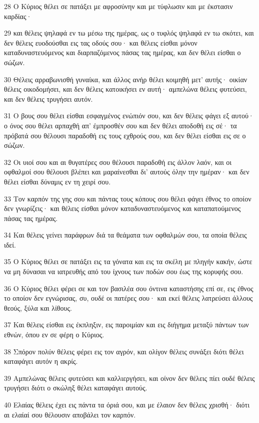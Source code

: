\par 28 Ο Κύριος θέλει σε πατάξει με αφροσύνην και με τύφλωσιν και με έκστασιν καρδίας·
\par 29 και θέλεις ψηλαφά εν τω μέσω της ημέρας, ως ο τυφλός ψηλαφά εν τω σκότει, και δεν θέλεις ευοδούσθαι εις τας οδούς σου· και θέλεις είσθαι μόνον καταδυναστευόμενος και διαρπαζόμενος πάσας τας ημέρας, και δεν θέλει είσθαι ο σώζων.
\par 30 Θέλεις αρραβωνισθή γυναίκα, και άλλος ανήρ θέλει κοιμηθή μετ' αυτής· οικίαν θέλεις οικοδομήσει, και δεν θέλεις κατοικήσει εν αυτή· αμπελώνα θέλεις φυτεύσει, και δεν θέλεις τρυγήσει αυτόν.
\par 31 Ο βους σου θέλει είσθαι εσφαγμένος ενώπιόν σου, και δεν θέλεις φάγει εξ αυτού· ο όνος σου θέλει αρπαχθή απ' έμπροσθέν σου και δεν θέλει αποδοθή εις σέ· τα πρόβατά σου θέλουσι παραδοθή εις τους εχθρούς σου, και δεν θέλει είσθαι εις σε ο σώζων.
\par 32 Οι υιοί σου και αι θυγατέρες σου θέλουσι παραδοθή εις άλλον λαόν, και οι οφθαλμοί σου θέλουσι βλέπει και μαραίνεσθαι δι' αυτούς όλην την ημέραν· και δεν θέλει είσθαι δύναμις εν τη χειρί σου.
\par 33 Τον καρπόν της γης σου και πάντας τους κόπους σου θέλει φάγει έθνος το οποίον δεν γνωρίζεις· και θέλεις είσθαι μόνον καταδυναστευόμενος και καταπατούμενος πάσας τας ημέρας.
\par 34 Και θέλεις γείνει παράφρων διά τα θεάματα των οφθαλμών σου, τα οποία θέλεις ιδεί.
\par 35 Ο Κύριος θέλει σε πατάξει εις τα γόνατα και εις τα σκέλη με πληγήν κακήν, ώστε να μη δύνασαι να ιατρευθής από του ίχνους των ποδών σου έως της κορυφής σου.
\par 36 Ο Κύριος θέλει φέρει σε και τον βασιλέα σου όντινα καταστήσης επί σε, εις έθνος το οποίον δεν εγνώρισας, συ, ουδέ οι πατέρες σου· και εκεί θέλεις λατρεύσει άλλους θεούς, ξύλα και λίθους.
\par 37 Και θέλεις είσθαι εις έκπληξιν, εις παροιμίαν και εις διήγημα μεταξύ πάντων των εθνών, όπου εν σε φέρη ο Κύριος.
\par 38 Σπόρον πολύν θέλεις φέρει εις τον αγρόν, και ολίγον θέλεις συνάξει διότι θέλει καταφάγει αυτόν η ακρίς.
\par 39 Αμπελώνας θέλεις φυτεύσει και καλλιεργήσει, και οίνον δεν θέλεις πίει ουδέ θέλεις τρυγήσει διότι ο σκώληξ θέλει καταφάγει αυτούς.
\par 40 Ελαίας θέλεις έχει εις πάντα τα όριά σου, και με έλαιον δεν θέλεις χρισθή· διότι αι ελαίαί σου θέλουσιν αποβάλει τον καρπόν.
